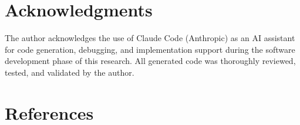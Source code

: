 \documentclass[
  11pt,
]{article}
\begin{document}
\pagebreak

\section*{Acknowledgments}\label{acknowledgments}

The author acknowledges the use of Claude Code (Anthropic) as an AI
assistant for code generation, debugging, and implementation support
during the software development phase of this research. All generated
code was thoroughly reviewed, tested, and validated by the author.

\section*{References}\label{references}
\end{document}
